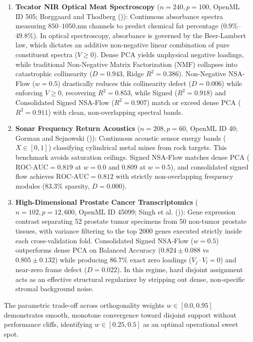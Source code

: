 \documentclass[
]{article}
\providecommand{\tightlist}{%
  \setlength{\itemsep}{0pt}\setlength{\parskip}{0pt}}
\begin{document}
\begin{enumerate}
\def\labelenumi{\arabic{enumi}.}
\tightlist
\item
  \textbf{Tecator NIR Optical Meat Spectroscopy} (\(n=240, p=100\), OpenML ID 505; Borggaard and Thodberg ()): Continuous absorbance spectra measuring \(850\)--\(1050\),nm channels to predict chemical fat percentage (\(0.9\%\)--\(49.8\%\)). In optical spectroscopy, absorbance is governed by the Beer-Lambert law, which dictates an additive non-negative linear combination of pure constituent spectra (\(V \ge 0\)). Dense PCA yields unphysical negative loadings, while traditional Non-Negative Matrix Factorization (NMF) collapses into catastrophic collinearity (\(D = 0.943\), Ridge \(R^2 = 0.386\)). Non-Negative NSA-Flow (\(w=0.5\)) drastically reduces this collinearity defect (\(D = 0.006\)) while enforcing \(V \ge 0\), recovering \(R^2 = 0.853\), while Signed (\(R^2 = 0.918\)) and Consolidated Signed NSA-Flow (\(R^2 = 0.907\)) match or exceed dense PCA (\(R^2 = 0.911\)) with clean, non-overlapping spectral bands.
\item
  \textbf{Sonar Frequency Return Acoustics} (\(n=208, p=60\), OpenML ID 40; Gorman and Sejnowski ()): Continuous acoustic sensor energy bands (\(X \in [0, 1]\)) classifying cylindrical metal mines from rock targets. This benchmark avoids saturation ceilings. Signed NSA-Flow matches dense PCA (\(\text{ROC-AUC} = 0.819\) at \(w=0.0\) and \(0.809\) at \(w=0.5\)), and consolidated signed flow achieves \(\text{ROC-AUC} = 0.812\) with strictly non-overlapping frequency modules (\(83.3\%\) sparsity, \(D = 0.000\)).
\item
  \textbf{High-Dimensional Prostate Cancer Transcriptomics} (\(n=102, p=12{,}600\), OpenML ID 45099; Singh et al. ()): Gene expression contrast separating 52 prostate tumor specimens from 50 non-tumor prostate tissues, with variance filtering to the top 2000 genes executed strictly inside each cross-validation fold. Consolidated Signed NSA-Flow (\(w=0.5\)) outperforms dense PCA on Balanced Accuracy (\(0.824 \pm 0.088\) vs \(0.805 \pm 0.132\)) while producing \(86.7\%\) exact zero loadings (\(V_j \cdot V_l = 0\)) and near-zero frame defect (\(D = 0.022\)). In this regime, hard disjoint assignment acts as an effective structural regularizer by stripping out dense, non-specific stromal background noise.
\end{enumerate}

The parametric trade-off across orthogonality weights \(w \in [0.0, 0.95]\) demonstrates smooth, monotone convergence toward disjoint support without performance cliffs, identifying \(w \in [0.25, 0.5]\) as an optimal operational sweet spot.
\end{document}
